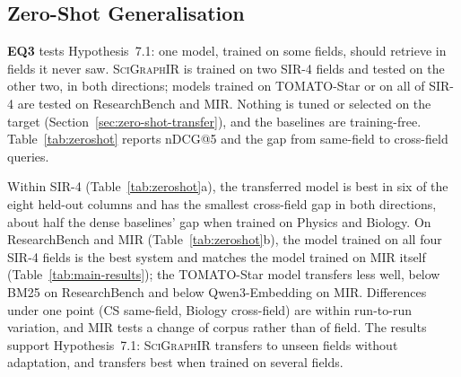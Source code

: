 \subsection{Zero-Shot Generalisation}
\label{sec:generalisation}

\textbf{EQ3} tests Hypothesis~7.1: one model, trained on some fields, should
retrieve in fields it never saw. \textsc{SciGraphIR} is trained on two SIR-4
fields and tested on the other two, in both directions; models trained on
TOMATO-Star or on all of SIR-4 are tested on ResearchBench and MIR. Nothing
is tuned or selected on the target (Section~\ref{sec:zero-shot-transfer}),
and the baselines are training-free. Table~\ref{tab:zeroshot} reports nDCG@5 and the gap from
same-field to cross-field queries.

Within SIR-4 (Table~\ref{tab:zeroshot}a), the transferred model is best in six of the eight held-out
columns and has the smallest cross-field gap in both directions, about half
the dense baselines' gap when trained on Physics and Biology. On
ResearchBench and MIR (Table~\ref{tab:zeroshot}b), the model trained on all four SIR-4 fields is the best
system and matches the model trained on MIR itself
(Table~\ref{tab:main-results}); the TOMATO-Star model transfers less well,
below BM25 on ResearchBench and below Qwen3-Embedding on MIR. Differences
under one point (CS same-field, Biology cross-field) are within run-to-run
variation, and MIR tests a change of corpus rather than of field. The results
support Hypothesis~7.1: \textsc{SciGraphIR} transfers to unseen fields
without adaptation, and transfers best when trained on several fields.

